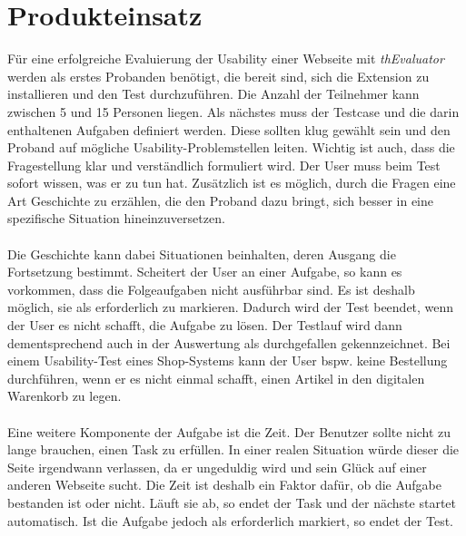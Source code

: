 %
%
%
%

\section{Produkteinsatz}

Für eine erfolgreiche Evaluierung der Usability einer Webseite mit \textit{thEvaluator} werden als erstes Probanden benötigt, die bereit sind, sich die Extension zu installieren und den Test durchzuführen. Die Anzahl der Teilnehmer kann zwischen 5 und 15 Personen liegen. Als nächstes muss der Testcase und die darin enthaltenen Aufgaben definiert werden. Diese sollten klug gewählt sein und den Proband auf mögliche Usability-Problemstellen leiten. Wichtig ist auch, dass die Fragestellung klar und verständlich formuliert wird. Der User muss beim Test sofort wissen, was er zu tun hat. Zusätzlich ist es möglich, durch die Fragen eine Art Geschichte zu erzählen, die den Proband dazu bringt, sich besser in eine spezifische Situation hineinzuversetzen.\\
\\
Die Geschichte kann dabei Situationen beinhalten, deren Ausgang die Fortsetzung bestimmt. Scheitert der User an einer Aufgabe, so kann es vorkommen, dass die Folgeaufgaben nicht ausführbar sind. Es ist deshalb möglich, sie als \glqq erforderlich\grqq{} zu markieren. Dadurch wird der Test beendet, wenn der User es nicht schafft, die Aufgabe zu lösen. Der Testlauf wird dann dementsprechend auch in der Auswertung als \glqq durchgefallen\grqq{} gekennzeichnet. Bei einem Usability-Test eines Shop-Systems kann der User bspw. keine Bestellung durchführen, wenn er es nicht einmal schafft, einen Artikel in den digitalen Warenkorb zu legen.\\
\\
Eine weitere Komponente der Aufgabe ist die Zeit. Der Benutzer sollte nicht zu lange brauchen, einen Task zu erfüllen. In einer realen Situation würde dieser die Seite irgendwann verlassen, da er ungeduldig wird und sein Glück auf einer anderen Webseite sucht. Die Zeit ist deshalb ein Faktor dafür, ob die Aufgabe bestanden ist oder nicht. Läuft sie ab, so endet der Task und der nächste startet automatisch. Ist die Aufgabe jedoch als \glqq erforderlich\grqq{} markiert, so endet der Test.\\
